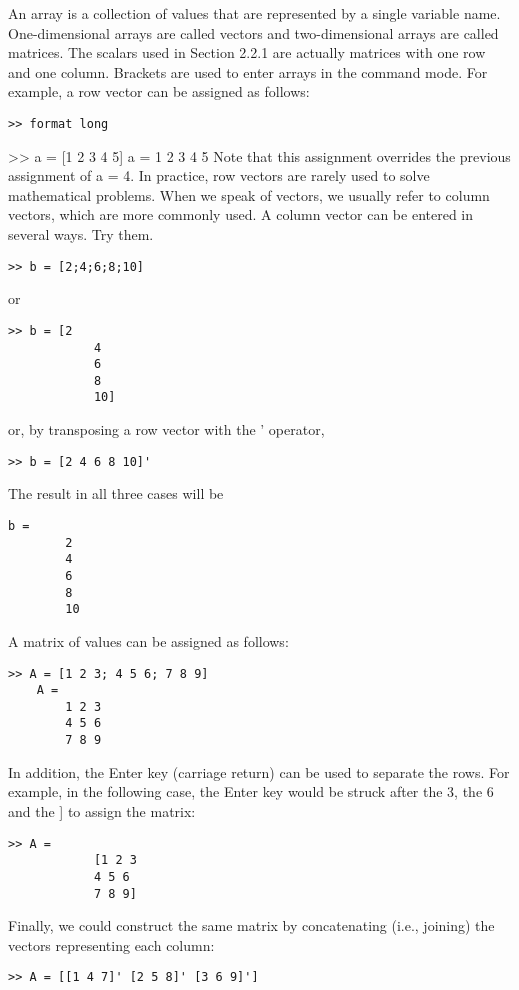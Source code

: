 \documentclass[../main.tex]{subfiles}
\begin{document}
An array is a collection of values that are represented by a single variable name. One-dimensional arrays are called vectors and two-dimensional arrays are called matrices. The
scalars used in Section 2.2.1 are actually matrices with one row and one column.
Brackets are used to enter arrays in the command mode. For example, a row vector can
be assigned as follows:
\begin{lstlisting}[frame=none, numbers=none]
	>> format long
\end{lstlisting}
>> a = [1 2 3 4 5]
a =
1 2 3 4 5
Note that this assignment overrides the previous assignment of a = 4.
In practice, row vectors are rarely used to solve mathematical problems. When we
speak of vectors, we usually refer to column vectors, which are more commonly used. A
column vector can be entered in several ways. Try them.
\begin{lstlisting}[frame=none, numbers=none]
	>> b = [2;4;6;8;10]
\end{lstlisting}
or
\begin{lstlisting}[frame=none, numbers=none]
	>> b = [2
			4
			6
			8
			10]
\end{lstlisting}
or, by transposing a row vector with the ' operator,
\begin{lstlisting}[frame=none, numbers=none]
	>> b = [2 4 6 8 10]'

\end{lstlisting}
The result in all three cases will be
\begin{lstlisting}[frame=none, numbers=none]
	b =
		2
		4
		6
		8
		10
\end{lstlisting}
A matrix of values can be assigned as follows:
\begin{lstlisting}[frame=none, numbers=none]
	>> A = [1 2 3; 4 5 6; 7 8 9]
	A =
		1 2 3
		4 5 6
		7 8 9
\end{lstlisting}
In addition, the Enter key (carriage return) can be used to separate the rows. For example,
in the following case, the Enter key would be struck after the 3, the 6 and the ] to assign the
matrix:
\begin{lstlisting}[frame=none, numbers=none]
	>> A = 
			[1 2 3
			4 5 6
			7 8 9]

\end{lstlisting}
Finally, we could construct the same matrix by concatenating (i.e., joining) the vectors
representing each column:
\begin{lstlisting}[frame=none, numbers=none]
	>> A = [[1 4 7]' [2 5 8]' [3 6 9]']
\end{lstlisting}
\end{document}
